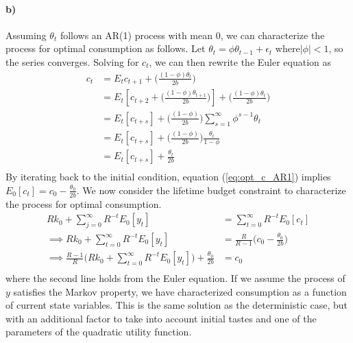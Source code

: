 \documentclass[11pt,letter]{article}
\begin{document}
\paragraph{b)} Assuming $\theta_{t}$ follows an AR(1) process with mean 0, we can characterize the process for optimal consumption as follows. Let $\theta_t = \phi \theta_{t-1} + \epsilon_t$ where$|\phi| <1$, so the series converges.  Solving for $c_t$, we can then  rewrite the Euler equation as 
\begin{equation}
\begin{split}
	c_t & = E_t c_{t+1}+\bigg(\frac{(1-\phi)\theta_t}{2b}\bigg)\\
	&=E_t\left[  c_{t+2} + \bigg(\frac{(1-\phi)\theta_{t+1}}{2b}\bigg)\right] +\bigg(\frac{(1-\phi)\theta_t}{2b}\bigg)\\
	&= E_t\left[  c_{t+s}\right] +\bigg(\frac{(1-\phi)}{2b}\bigg)\sum_{s = 1}^{\infty}\phi^{s-1}\theta_t\\
	&= E_t\left[  c_{t+s}\right] +\bigg(\frac{(1-\phi)}{2b}\bigg)\frac{\theta_t}{1-\phi}\\
	&= E_t\left[c_{t+s}\right] + \frac{\theta_t}{2b}\\
\end{split}
\label{eq:opt_c_AR1}
\end{equation}
By iterating back to the initial condition,  equation (\ref{eq:opt_c_AR1})  implies $E_0\left[c_{t}\right] = c_0 -\frac{\theta_0}{2b}$. 
We now consider the lifetime budget constraint to characterize the process for optimal consumption. 	
\begin{equation*}
\begin{split}
Rk_0 + \sum_{j = 0}^{\infty}R^{-t}E_0\left[ y_t\right] &= \sum_{t=0}^{\infty}R^{-t}E_0\left[c_t\right]\\
\implies Rk_0 + \sum_{t=0}^{\infty}R^{-t}E_0\left[y_t\right]  &= \frac{R}{R-1}\bigg(c_0 -\frac{\theta_0}{2b}\bigg)\\
\implies \frac{R-1}{R}\bigg(Rk_0 + \sum_{t = 0}^{\infty}R^{-t}E_0\left[y_t\right]\bigg) +\frac{\theta_0}{2b} &= c_0\\
\end{split}
\end{equation*}
where the second line holds from the Euler equation. If we assume the process of $y$ satisfies the Markov property, we have characterized consumption as a function of current state variables. This is the same solution as the deterministic case, but with an additional factor to take into account initial tastes and one of the parameters of the quadratic utility function. 
\end{document}
